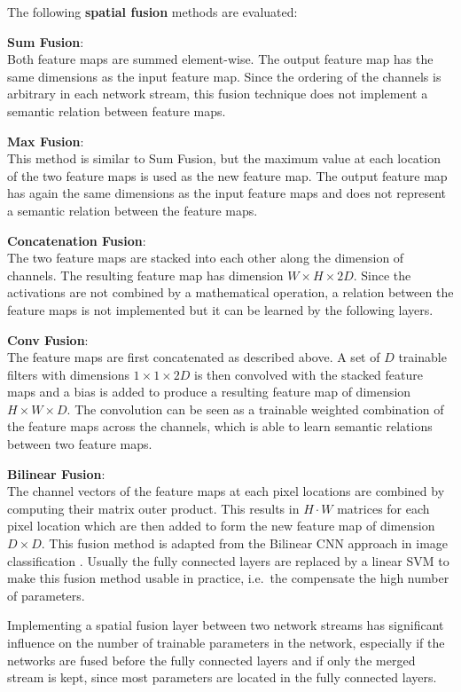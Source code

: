 The following \textbf{spatial fusion} methods are evaluated:

\textbf{Sum Fusion}:\\
Both feature maps are summed element-wise.
The output feature map has the same dimensions as the input feature map.
Since the ordering of the channels is arbitrary in each network stream, this fusion technique does not implement a semantic relation between feature maps.

\textbf{Max Fusion}:\\
This method is similar to Sum Fusion, but the maximum value at each location of the two feature maps is used as the new feature map.
The output feature map has again the same dimensions as the input feature maps and does not represent a semantic relation between the feature maps.

\textbf{Concatenation Fusion}:\\
The two feature maps are stacked into each other along the dimension of channels.
The resulting feature map has dimension $W \times H \times 2D$.
Since the activations are not combined by a mathematical operation, a relation between the feature maps is not implemented but it can be learned by the following layers.

\textbf{Conv Fusion}:\\
The feature maps are first concatenated as described above.
A set of $D$ trainable filters with dimensions $1 \times 1 \times 2D$ is then convolved with the stacked feature maps and a bias is added to produce a resulting feature map of dimension $H \times W \times D$.
The convolution can be seen as a trainable weighted combination of the feature maps across the channels, which is able to learn semantic relations between two feature maps.

\textbf{Bilinear Fusion}:\\
The channel vectors of the feature maps at each pixel locations are combined by computing their matrix outer product.
This results in $H \cdot W$ matrices for each pixel location which are then added to form the new feature map of dimension $D \times D$.
This fusion method is adapted from the Bilinear CNN approach in image classification \cite{lin_bilinear_2015}.
Usually the fully connected layers are replaced by a linear SVM to make this fusion method usable in practice, i.e.\ the compensate the high number of parameters.

Implementing a spatial fusion layer between two network streams has significant influence on the number of trainable parameters in the network, especially if the networks are fused before the fully connected layers and if only the merged stream is kept, since most parameters are located in the fully connected layers.

